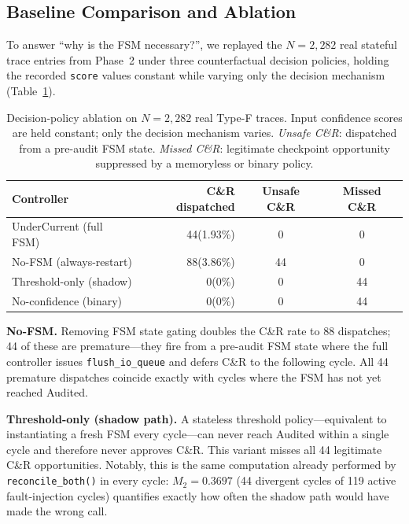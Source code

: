 \documentclass[conference]{IEEEtran}
\begin{document}
\subsection{Baseline Comparison and Ablation}
\label{sec:ablation}

To answer ``why is the FSM necessary?'', we replayed the $N = 2{,}282$ real stateful trace entries from Phase~2 under three counterfactual decision policies, holding the recorded \texttt{score} values constant while varying only the decision mechanism (Table~\ref{tab:ablation}).

\begin{table}[t]
\caption{Decision-policy ablation on $N = 2{,}282$ real Type-F traces. Input confidence scores are held constant; only the decision mechanism varies. \emph{Unsafe C\&R}: dispatched from a pre-audit FSM state. \emph{Missed C\&R}: legitimate checkpoint opportunity suppressed by a memoryless or binary policy.}
\label{tab:ablation}
\centering
\begin{tabular}{lrcc}
\hline
Controller & C\&R dispatched & Unsafe C\&R & Missed C\&R \\
\hline
UnderCurrent (full FSM) & 44\;(1.93\%) & 0 & 0 \\
No-FSM (always-restart) & 88\;(3.86\%) & 44 & 0 \\
Threshold-only (shadow) & 0\;\;\;(0\%) & 0 & 44 \\
No-confidence (binary) & 0\;\;\;(0\%) & 0 & 44 \\
\hline
\end{tabular}
\end{table}

\textbf{No-FSM.} Removing FSM state gating doubles the C\&R rate to 88 dispatches; 44 of these are premature---they fire from a pre-audit FSM state where the full controller issues \texttt{flush\_io\_queue} and defers C\&R to the following cycle. All 44 premature dispatches coincide exactly with cycles where the FSM has not yet reached Audited.

\textbf{Threshold-only (shadow path).} A stateless threshold policy---equivalent to instantiating a fresh FSM every cycle---can never reach Audited within a single cycle and therefore never approves C\&R. This variant misses all 44 legitimate C\&R opportunities. Notably, this is the same computation already performed by \texttt{reconcile\_both()} in every cycle: $M_2 = 0.3697$ (44 divergent cycles of 119 active fault-injection cycles) quantifies exactly how often the shadow path would have made the wrong call.
\end{document}
